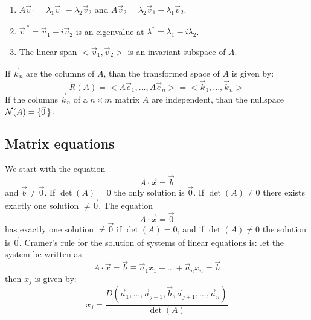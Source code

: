 \documentclass[twoside]{report}
\begin{document}
\begin{enumerate}
\item $A\vec{v}_1=\lambda_1\vec{v}_1-\lambda_2\vec{v}_2$ and $A\vec{v}_2=\lambda_2\vec{v}_1+\lambda_1\vec{v}_2$.
\item $\vec{v}^{~*}=\vec{v}_1-i\vec{v}_2$ is an eigenvalue at $\lambda^*=\lambda_1-i\lambda_2$.
\item The linear span $<\vec{v}_1,\vec{v}_2>$ is an invariant subspace of $A$.
\end{enumerate}
If $\vec{k}_n$ are the columns of $A$, than the transformed space of $A$ is
given by:
\[
R(A)=<A\vec{e}_1,...,A\vec{e}_n>=<\vec{k}_1,...,\vec{k}_n>
\]
If the columns $\vec{k}_n$ of a $n\times m$ matrix $A$ are independent, than
the nullspace ${\cal N}(A)=\{\vec{0}\,\}$.

\subsection{Matrix equations}
We start with the equation
\[
A\cdot\vec{x}=\vec{b}
\]
and $\vec{b}\neq\vec{0}$. If $\det(A)=0$ the only solution is $\vec{0}$. If
$\det(A)\neq0$ there exists exactly one solution $\neq\vec{0}$.
\npar
The equation
\[
A\cdot\vec{x}=\vec{0}
\]
has exactly one solution $\neq\vec{0}$ if $\det(A)=0$, and if
$\det(A)\neq0$ the solution is $\vec{0}$.
\npar
Cramer's rule for the solution of systems of linear equations is: let the
system be written as
\[
A\cdot\vec{x}=\vec{b}\equiv\vec{a}_1x_1+...+\vec{a}_nx_n=\vec{b}
\]
then $x_j$ is given by:
\[
x_j=\frac{D(\vec{a}_1,...,\vec{a}_{j-1},\vec{b},\vec{a}_{j+1},...,\vec{a}_n)}{\det(A)}
\]
\end{document}
